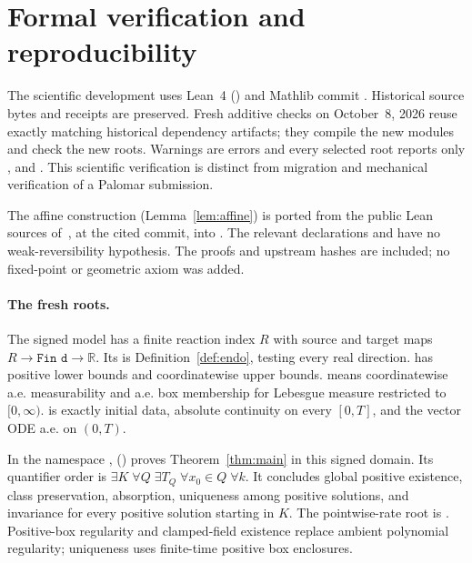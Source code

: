 \documentclass[11pt]{article}
\theoremstyle{definition}
\theoremstyle{remark}
\newcommand{\R}{\mathbb R}
\begin{document}
\section{Formal verification and reproducibility}\label{sec:formal}

The scientific development uses Lean~4 () and
Mathlib commit . Historical
source bytes and receipts are preserved. Fresh additive checks on October~8,
2026 reuse exactly matching historical dependency artifacts; they compile the
new modules and check the new roots. Warnings are errors and every selected
root reports only ,  and .
This scientific verification is distinct from migration and mechanical
verification of a Palomar submission.

The affine construction (Lemma~\ref{lem:affine}) is ported from the public Lean
sources of~\cite{OpenAI2026Boundedness,OpenAI2026Uniform}, at the cited commit,
into . The relevant declarations
 and
 have no weak-reversibility hypothesis.
The proofs and upstream hashes are included; no fixed-point or geometric axiom
was added.

\paragraph{The fresh roots.}
The signed model has a finite reaction index $R$ with source and target maps
$R\to\texttt{Fin d}\to\R$. Its  is Definition~\ref{def:endo},
testing every real direction.  has positive lower bounds
and coordinatewise upper bounds.  means coordinatewise
a.e. measurability and a.e. box membership for Lebesgue measure restricted to
$[0,\infty)$.  is exactly initial data, absolute
continuity on every $[0,T]$, and the vector ODE a.e. on $(0,T)$.

In the namespace ,
() proves Theorem~\ref{thm:main} in
this signed domain. Its quantifier order is
$\exists K\;\forall Q\;\exists T_Q\;\forall x_0\in Q\;\forall k$.
It concludes global positive existence, class preservation, absorption,
uniqueness among positive solutions, and invariance for every positive solution
starting in $K$. The pointwise-rate root is
. Positive-box regularity and
clamped-field existence replace ambient polynomial regularity; uniqueness
uses finite-time positive box enclosures.
\end{document}
